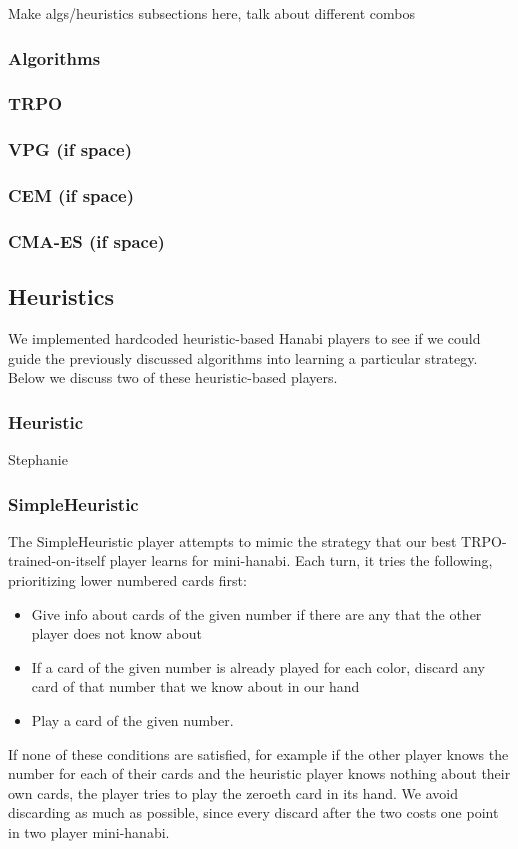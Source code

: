 Make algs/heuristics subsections here, talk about different combos

\subsubsection{Algorithms}

\subsubsection{TRPO}

\cite{TRPO}

\subsubsection{VPG (if space)}
\subsubsection{CEM (if space)}
\subsubsection{CMA-ES (if space)}

\subsection{Heuristics}

We implemented hardcoded heuristic-based Hanabi players to see if we could
guide the previously discussed algorithms into learning a particular strategy.
Below we discuss two of these heuristic-based players.

\subsubsection{Heuristic}

Stephanie

\subsubsection{SimpleHeuristic}

The SimpleHeuristic player attempts to mimic the strategy that our best
TRPO-trained-on-itself player learns for mini-hanabi. Each turn, it tries the
following, prioritizing lower numbered cards first:

\begin{itemize}
\item Give info about cards of the given number if there are any that the other player does not know about
\item If a card of the given number is already played for each color, discard any card of that number that we know about in our hand
\item Play a card of the given number.
\end{itemize}

If none of these conditions are satisfied, for example if the other player
knows the number for each of their cards and the heuristic player knows
nothing about their own cards, the player tries to play the zeroeth card in
its hand. We avoid discarding as much as possible, since every discard after
the two costs one point in two player mini-hanabi.


